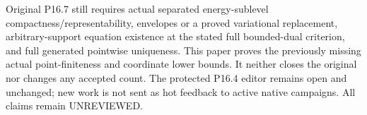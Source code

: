 \documentclass[11pt]{article}
\theoremstyle{remark}\newtheorem{remark}[theorem]{Remark}
\begin{document}
Original P16.7 still requires actual separated energy-sublevel
compactness/representability, envelopes or a proved variational
replacement, arbitrary-support equation existence at the stated
full bounded-dual criterion, and full generated pointwise uniqueness.
This paper proves the previously missing actual point-finiteness
and coordinate lower bounds. It neither closes the original nor
changes any accepted count. The protected P16.4 editor remains open
and unchanged; new work is not sent as hot feedback to active
native campaigns. All claims remain UNREVIEWED.
\end{document}
